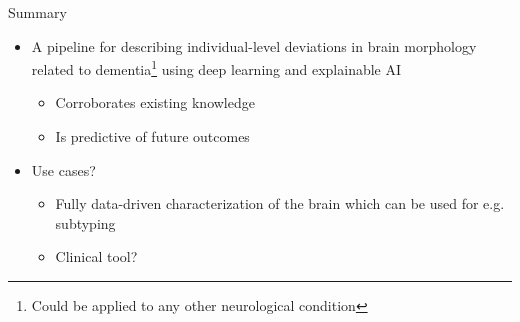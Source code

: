 \documentclass[t]{beamer}
\begin{document}
	\begin{frame}{Summary}
		\vfill
		\centering
		\begin{itemize}
			\item A pipeline for describing individual-level deviations in brain morphology related to dementia\footnote{Could be applied to any other neurological condition} using deep learning and explainable AI
			\begin{itemize}
				\item Corroborates existing knowledge
				\item Is predictive of future outcomes
			\end{itemize}
			\item Use cases?
			\begin{itemize}
				\item Fully data-driven characterization of the brain which can be used for e.g. subtyping
				\item Clinical tool?
			\end{itemize}
		\end{itemize}
		\vfill
	\end{frame}
\end{document}

